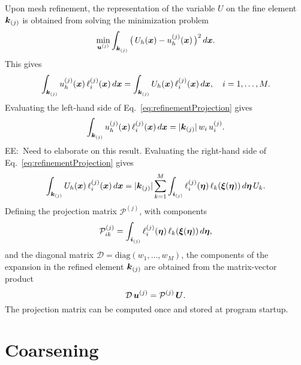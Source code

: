 \documentclass[10pt]{article}
\newcommand{\ee}[1]{{\color{blue} EE:~#1}}
\begin{document}
Upon mesh refinement, the representation of the variable $U$ on the fine element $\boldsymbol{k}_{(j)}$ is obtained from solving the minimization problem
\begin{equation}
  \min_{\boldsymbol{u}^{(j)}}\int_{\boldsymbol{k}_{(j)}}\big(\,U_{h}(\boldsymbol{x})-u_{h}^{(j)}(\boldsymbol{x})\,\big)^{2}\,d\boldsymbol{x}.  
\end{equation}
This gives
\begin{equation}
  \int_{\boldsymbol{k}_{(j)}}u_{h}^{(j)}(\boldsymbol{x})\,\ell_{i}^{(j)}(\boldsymbol{x})\,d\boldsymbol{x}
  =\int_{\boldsymbol{k}_{(j)}}U_{h}(\boldsymbol{x})\,\ell_{i}^{(j)}(\boldsymbol{x})\,d\boldsymbol{x},\quad i=1,\ldots,M.  
  \label{eq:refinementProjection}
\end{equation}
Evaluating the left-hand side of Eq.~\eqref{eq:refinementProjection} gives
\begin{equation}
  \int_{\boldsymbol{k}_{(j)}}u_{h}^{(j)}(\boldsymbol{x})\,\ell_{i}^{(j)}(\boldsymbol{x})\,d\boldsymbol{x}
  =|\boldsymbol{k}_{(j)}|\,w_{i}\,u_{i}^{(j)}.  
\end{equation}
\ee{Need to elaborate on this result.}
Evaluating the right-hand side of Eq.~\eqref{eq:refinementProjection} gives
\begin{equation}
  \int_{\boldsymbol{k}_{(j)}}U_{h}(\boldsymbol{x})\,\ell_{i}^{(j)}(\boldsymbol{x})\,d\boldsymbol{x}
  =|\boldsymbol{k}_{(j)}|\sum_{k=1}^{M}\int_{\boldsymbol{i}_{(j)}}\ell_{i}^{(j)}(\boldsymbol{\eta})\,\ell_{k}(\boldsymbol{\xi}(\boldsymbol{\eta}))\,d\boldsymbol{\eta}\,U_{k}.
\end{equation}
Defining the projection matrix $\mathcal{P}^{(j)}$, with components
\begin{equation}
  \mathcal{P}_{ik}^{(j)} = \int_{\boldsymbol{i}_{(j)}}\ell_{i}^{(j)}(\boldsymbol{\eta})\,\ell_{k}(\boldsymbol{\xi}(\boldsymbol{\eta}))\,d\boldsymbol{\eta},
  \label{eq:refinementProjectionMatrix}
\end{equation}
and the diagonal matrix $\mathcal{D}=\mbox{diag}(w_{1},\ldots,w_{M})$, the components of the expansion in the refined element $\boldsymbol{k}_{(j)}$ are obtained from the matrix-vector product
\begin{equation}
  \mathcal{D}\,\boldsymbol{u}^{(j)} = \mathcal{P}^{(j)}\,\boldsymbol{U}.  
\end{equation}
The projection matrix can be computed once and stored at program startup.  

\section{Coarsening}
\end{document}

